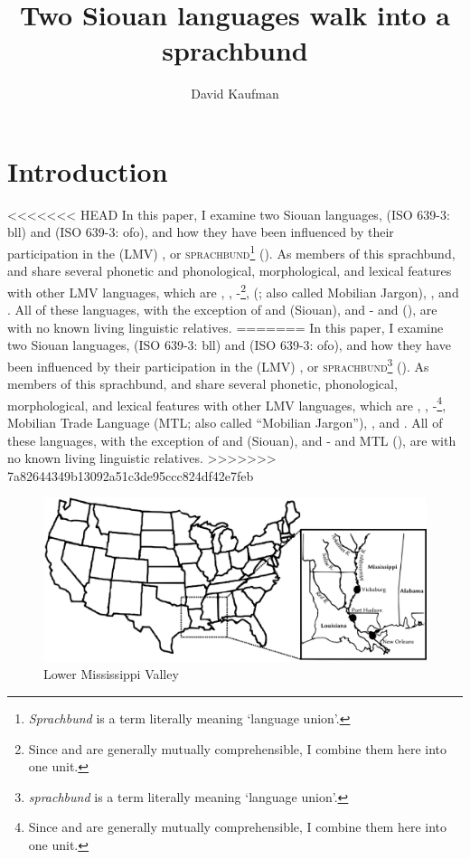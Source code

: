 \documentclass[output=paper]{LSP/langsci}
\author{David Kaufman}
\title{Two {Siouan} languages walk into a sprachbund}
\begin{document}
\section{Introduction}
<<<<<<< HEAD
In this paper, I examine two Siouan languages,  (ISO 639-3: bll) and  (ISO 639-3: ofo), and how they have been influenced by their participation in the  (LMV) , or \textsc{sprachbund}\footnote{\emph{Sprachbund} is a  term literally meaning `language union'.} (\citealt[3]{Kaufman2014}). As members of this sprachbund,  and  share several phonetic and phonological, morphological, and lexical features with other LMV languages, which are , , -\footnote{Since  and  are generally mutually comprehensible, I combine them here into one unit.},  (; also called {Mobilian Jargon}), , and . All of these languages, with the exception of  and  (Siouan), and - and  (), are  with no known living linguistic relatives. 
=======
In this paper, I examine two Siouan languages,  (ISO 639-3: bll) and  (ISO 639-3: ofo), and how they have been influenced by their participation in the  (LMV) , or \textsc{sprachbund}\footnote{\emph{sprachbund} is a  term literally meaning `language union'.} (\citealt[3]{Kaufman2014}). As members of this sprachbund,  and  share several phonetic, phonological, morphological, and lexical features with other LMV languages, which are , , -\footnote{Since  and  are generally mutually comprehensible, I combine them here into one unit.}, Mobilian Trade Language (MTL; also called ``Mobilian Jargon''), , and . All of these languages, with the exception of  and  (Siouan), and - and MTL (), are  with no known living linguistic relatives. 
>>>>>>> 7a82644349b13092a51c3de95ccc824df42e7feb

\begin{figure}
\caption{Lower Mississippi Valley} \label{map}
\includegraphics[width=12cm]{figures/Kaufman1}
\end{figure}
\end{document}
